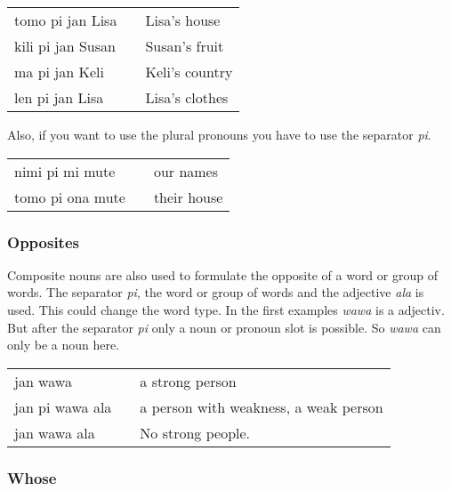 \begin{supertabular}{p{5,5cm}|ll}
    tomo pi jan Lisa  &  & Lisa's house   \\
    kili pi jan Susan &  & Susan's fruit  \\
    ma pi jan Keli    &  & Keli's country \\
    len pi jan Lisa   &  & Lisa's clothes \\
\end{supertabular}

Also, if you want to use the plural pronouns you have to use the separator \textit{pi}.

\begin{supertabular}{p{5,5cm}|ll}
    nimi pi mi mute  &  & our names   \\
    tomo pi ona mute &  & their house \\
\end{supertabular}
%
\subsubsection*{Opposites}
%

Composite nouns are also used to formulate the opposite of a word or group of words.
The separator \textit{pi}, the word or group of words and the adjective \textit{ala} is used.
This could change the word type.
In the first examples \textit{wawa} is a adjectiv.
But after the separator \textit{pi} only a noun or pronoun slot is possible.
So \textit{wawa} can only be a noun here.

\begin{supertabular}{p{5,5cm}|ll}
    jan wawa        &  & a strong person                       \\
    jan pi wawa ala &  & a person with weakness, a weak person \\
    jan wawa ala    &  & No strong people.                     \\
\end{supertabular}

%
\subsubsection*{Whose}
%

